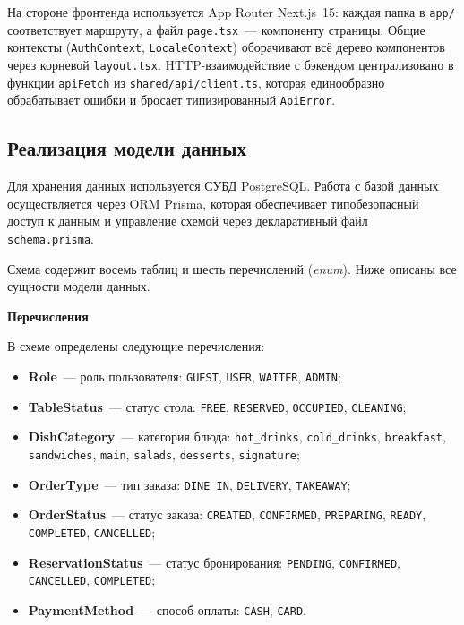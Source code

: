 На стороне фронтенда используется App Router Next.js~15: каждая папка
в \texttt{app/} соответствует маршруту, а файл \texttt{page.tsx}~---
компоненту страницы. Общие контексты (\texttt{AuthContext},
\texttt{LocaleContext}) оборачивают всё дерево компонентов через корневой
\texttt{layout.tsx}. HTTP-взаимодействие с бэкендом централизовано
в функции \texttt{apiFetch} из \texttt{shared/api/client.ts}, которая
единообразно обрабатывает ошибки и бросает типизированный
\texttt{ApiError}.

\subsection{Реализация модели данных}

Для хранения данных используется СУБД PostgreSQL. Работа с базой данных
осуществляется через ORM Prisma, которая обеспечивает типобезопасный
доступ к данным и управление схемой через декларативный файл
\texttt{schema.prisma}.

Схема содержит восемь таблиц и шесть перечислений (\textit{enum}).
Ниже описаны все сущности модели данных.

\textbf{Перечисления}

В схеме определены следующие перечисления:
\begin{itemize}
  \item \textbf{Role}~--- роль пользователя: \texttt{GUEST},
        \texttt{USER}, \texttt{WAITER}, \texttt{ADMIN};
  \item \textbf{TableStatus}~--- статус стола: \texttt{FREE},
        \texttt{RESERVED}, \texttt{OCCUPIED}, \texttt{CLEANING};
  \item \textbf{DishCategory}~--- категория блюда:
        \texttt{hot\_drinks}, \texttt{cold\_drinks},
        \texttt{breakfast}, \texttt{sandwiches}, \texttt{main},
        \texttt{salads}, \texttt{desserts}, \texttt{signature};
  \item \textbf{OrderType}~--- тип заказа: \texttt{DINE\_IN},
        \texttt{DELIVERY}, \texttt{TAKEAWAY};
  \item \textbf{OrderStatus}~--- статус заказа: \texttt{CREATED},
        \texttt{CONFIRMED}, \texttt{PREPARING}, \texttt{READY},
        \texttt{COMPLETED}, \texttt{CANCELLED};
  \item \textbf{ReservationStatus}~--- статус бронирования:
        \texttt{PENDING}, \texttt{CONFIRMED}, \\ \texttt{CANCELLED},
        \texttt{COMPLETED};
  \item \textbf{PaymentMethod}~--- способ оплаты: \texttt{CASH},
        \texttt{CARD}.
\end{itemize}

